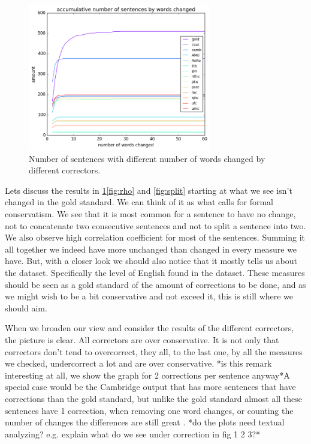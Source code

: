 \documentclass[english]{article}
\begin{document}
\begin{figure}
	\includegraphics[width = 8cm]{words_differences}
	\caption{Number of sentences with different number of words changed by different correctors.}
	\label{fig:words_changed}
\end{figure}

Lets discuss the results in \ref{fig:words_changed}\ref{fig:rho} and \ref{fig:split} starting at what we see isn't changed in the gold standard. We can think of it as what calls for formal conservatism. We see that it is most common for a sentence to have
no change, not to concatenate two consecutive sentences and not to
split a sentence into two. We also observe high correlation coefficient
for most of the sentences. Summing it all together we indeed have
more unchanged than changed in every measure we have. But, with a
closer look we should also notice that it mostly tells us about the
dataset. Specifically the level of English found in the dataset.
These measures should be seen as a gold standard of the amount of
corrections to be done, and as we might wish to be a bit conservative
and not exceed it, this is still where we should aim.

When we broaden our view and consider the results of the different
correctors, the picture is clear. All correctors are over conservative.
It is not only that correctors don't tend to overcorrect, they all,
to the last one, by all the measures we checked, undercorrect a lot
and are over conservative. {*}is this remark interesting at all, we show the graph for 2 corrections per sentence anyway{*}A special case would be the Cambridge output that has more sentences that have corrections than the gold standard, but unlike the gold standard almost all these sentences have 1 correction, when removing one word changes, or counting the number of changes the differences are still great . {*}do the plots need textual analyzing? e.g. explain what do we see under correction in fig 1 2 3?{*}
\end{document}
